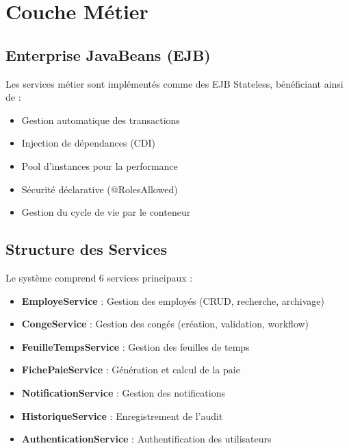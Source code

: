 \documentclass[12pt,a4paper,twoside]{report}
\begin{document}
\section{Couche Métier}

\subsection{Enterprise JavaBeans (EJB)}

Les services métier sont implémentés comme des EJB Stateless, bénéficiant ainsi de :
\begin{itemize}
    \item Gestion automatique des transactions
    \item Injection de dépendances (CDI)
    \item Pool d'instances pour la performance
    \item Sécurité déclarative (@RolesAllowed)
    \item Gestion du cycle de vie par le conteneur
\end{itemize}

\subsection{Structure des Services}

Le système comprend 6 services principaux :

\begin{itemize}
    \item \textbf{EmployeService} : Gestion des employés (CRUD, recherche, archivage)
    \item \textbf{CongeService} : Gestion des congés (création, validation, workflow)
    \item \textbf{FeuilleTempsService} : Gestion des feuilles de temps
    \item \textbf{FichePaieService} : Génération et calcul de la paie
    \item \textbf{NotificationService} : Gestion des notifications
    \item \textbf{HistoriqueService} : Enregistrement de l'audit
    \item \textbf{AuthenticationService} : Authentification des utilisateurs
\end{itemize}
\end{document}
